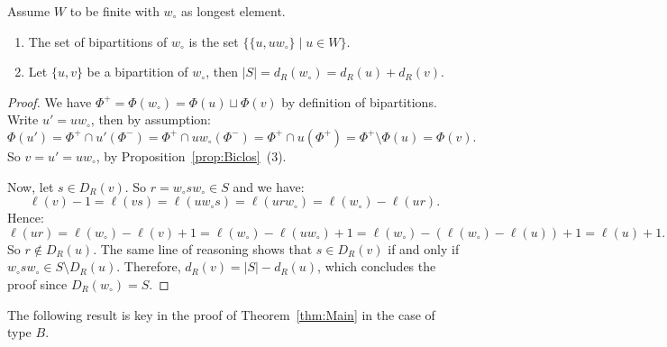 \documentclass[Unicode]{cedram-alco}
\theoremstyle{definition}
\begin{document}
\begin{prop}\label{prop:Longest} Assume $W$ to be finite with $w_\circ$ as longest element.
\begin{enumerate} 
\item The set of bipartitions of $w_\circ$ is the set $\{\{u,uw_\circ\}\mid u\in W\}$.
\item Let  $\{u,v\}$ be a bipartition of  $w_\circ$, then 
$
|S|=d_R(w_\circ)=d_R(u)+d_R(v).
$
\end{enumerate}
\end{prop}
\begin{proof} We have $\Phi^+=\Phi(w_\circ)=\Phi(u)\sqcup \Phi(v)$ by definition of bipartitions. Write $u'=uw_\circ $, then by assumption: 
$$
\Phi(u')=\Phi^+\cap u'(\Phi^-)= \Phi^+\cap uw_\circ(\Phi^-)= \Phi^+\cap u(\Phi^+)=\Phi^+\setminus \Phi(u)=\Phi(v).
$$
So $v=u'=uw_\circ$, by Proposition~\ref{prop:Biclos}~(3). 

Now, let $s\in D_R(v)$. So $r=w_\circ s w_\circ \in S$ and we have:
$$
\ell(v)-1= \ell(vs)=\ell(uw_\circ s)=\ell(ur w_\circ)= \ell(w_\circ)-\ell(ur).
$$
Hence:
$$
\ell(ur)=\ell(w_\circ) - \ell(v)+1=\ell(w_\circ) - \ell(uw_\circ)+1=\ell(w_\circ) - (\ell(w_\circ)-\ell(u))+1=\ell(u)+1.
$$
So $r\notin D_R(u)$. The same line of reasoning shows that $s\in D_R(v)$ if and only if $w_\circ s w_\circ \in S\setminus D_R(u)$. Therefore, $d_R(v)=|S|-d_R(u)$, which concludes the proof since $D_R(w_\circ)=S$.
\end{proof}

The following result is key in the proof of Theorem~\ref{thm:Main} in the case of type $B$.
\end{document}
